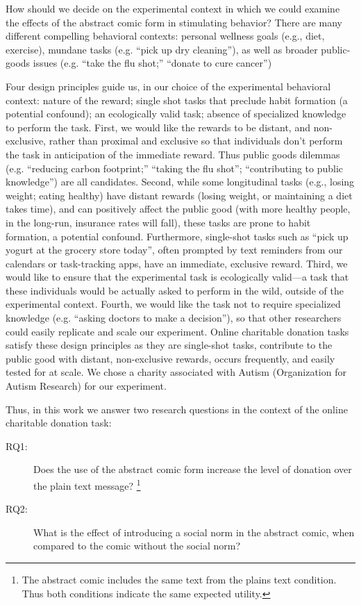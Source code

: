 How should we decide on the experimental context in which we could examine the effects of the abstract comic form in stimulating behavior? There are many different compelling behavioral contexts: personal wellness goals (e.g., diet, exercise), mundane tasks (e.g. ``pick up dry cleaning''), as well as broader public-goods issues (e.g. ``take the flu shot;'' ``donate to cure cancer'')

Four design principles guide us, in our choice of the experimental behavioral context: nature of the reward; single shot tasks that preclude habit formation (a potential confound); an ecologically valid task; absence of specialized knowledge to perform the task. First, we would like the rewards to be distant, and non-exclusive, rather than proximal and exclusive so that individuals don't perform the task in anticipation of the immediate reward. Thus public goods dilemmas (e.g. ``reducing carbon footprint;'' ``taking the flu shot''; ``contributing to public knowledge'') are all candidates. Second, while some longitudinal tasks (e.g., losing weight; eating healthy) have distant rewards (losing weight, or maintaining a diet takes time), and can positively affect the public good (with more healthy people, in the long-run, insurance rates will fall), these tasks are prone to habit formation, a potential confound. Furthermore, single-shot tasks such as ``pick up yogurt at the grocery store today'', often prompted by text reminders from our calendars or task-tracking apps, have an immediate, exclusive reward. Third, we would like to ensure that the experimental task is ecologically valid---a task that these individuals would be actually asked to perform in the wild, outside of the experimental context. Fourth, we would like the task not to require specialized knowledge (e.g. ``asking doctors to make a decision''), so that other researchers could easily replicate and scale our experiment. Online charitable donation tasks satisfy these design principles as they are single-shot tasks, contribute to the public good with distant, non-exclusive rewards, occurs frequently, and easily tested for at scale. We chose a charity associated with Autism (Organization for Autism Research) for our experiment.

Thus, in this work we answer two research questions in the context of the online charitable donation task:
\begin{description}
    \item[RQ1:] Does the use of the abstract comic form increase the level of donation over the plain text message? \footnote{The abstract comic includes the same text from the plains text condition. Thus both conditions indicate the same expected utility.}
    \item[RQ2:] What is the effect of introducing a social norm in the abstract comic, when compared to the comic without the social norm?
\end{description}

